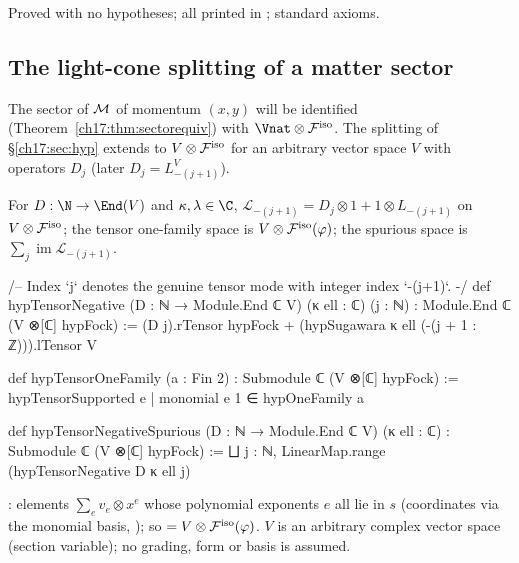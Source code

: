 \begin{status}
Proved with no hypotheses; all printed in ; standard axioms.
\end{status}

\subsection{The light-cone splitting of a matter sector}

The sector of $\mathcal{M}$ of momentum $(x,y)$ will be identified (Theorem~\ref{ch17:thm:sectorequiv}) with
$\Vnat\otimes\chseventeenF^{\mathrm{iso}}$.  The splitting of \S\ref{ch17:sec:hyp} extends to $V\otimes\mathcal{F}^{\mathrm{iso}}$ for an
arbitrary vector space $V$ with operators $D_j$ (later $D_j=L^V_{-(j+1)}$).

\begin{definition}\label{ch17:def:tensornegative}
For $D:\N\to\End(V)$ and $\kappa,\lambda\in\C$, $\mathcal L_{-(j+1)}=D_j\otimes1+1\otimes L_{-(j+1)}$ on $V\otimes\mathcal{F}^{\mathrm{iso}}$; the
tensor one-family space is $V\otimes\mathcal{F}^{\mathrm{iso}}(\varphi)$; the spurious space is $\sum_j\operatorname{im}\mathcal L_{-(j+1)}$.
\end{definition}

\begin{leancode}
/-- Index `j` denotes the genuine tensor mode with integer index `-(j+1)`. -/
def hypTensorNegative (D : ℕ → Module.End ℂ V) (κ ell : ℂ) (j : ℕ) :
    Module.End ℂ (V ⊗[ℂ] hypFock) :=
  (D j).rTensor hypFock + (hypSugawara κ ell (-(j + 1 : ℤ))).lTensor V

def hypTensorOneFamily (a : Fin 2) : Submodule ℂ (V ⊗[ℂ] hypFock) :=
  hypTensorSupported {e | monomial e 1 ∈ hypOneFamily a}

def hypTensorNegativeSpurious (D : ℕ → Module.End ℂ V) (κ ell : ℂ) :
    Submodule ℂ (V ⊗[ℂ] hypFock) := ⨆ j : ℕ, LinearMap.range (hypTensorNegative D κ ell j)
\end{leancode}

\begin{dictionary}
: elements $\sum_ev_e\otimes x^e$ whose polynomial exponents $e$ all lie in $s$ (coordinates via
the monomial basis, ); so  $=V\otimes\mathcal{F}^{\mathrm{iso}}(\varphi)$.  $V$ is an
arbitrary complex vector space (section variable); no grading, form or basis is assumed.
\end{dictionary}

